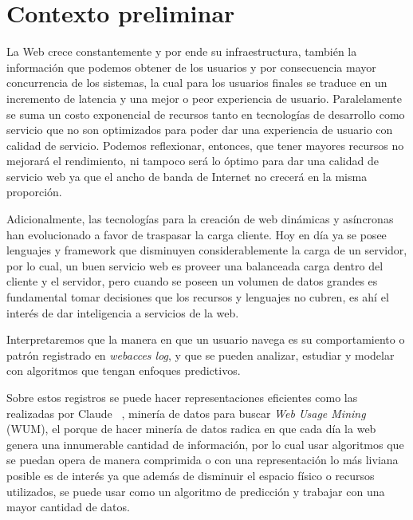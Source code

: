 \section{Contexto preliminar} 
\label{sec:preliminar}


  La Web crece constantemente y por ende su infraestructura, también la información que podemos obtener de los  usuarios y  por consecuencia mayor concurrencia de los sistemas, la cual para los usuarios finales se traduce en un incremento de latencia y una mejor o peor experiencia de usuario. Paralelamente se suma un costo exponencial de recursos tanto en tecnologías de desarrollo como servicio que no son optimizados para poder dar una experiencia de usuario con calidad de servicio. Podemos reflexionar, entonces, que tener mayores recursos no mejorará el rendimiento, ni tampoco será lo óptimo para dar una calidad de servicio web ya que el ancho de banda de Internet no crecerá en la misma proporción.
   
  Adicionalmente, las tecnologías para la creación de web dinámicas y asíncronas han evolucionado a favor de traspasar la carga cliente.
  Hoy en día ya se posee lenguajes y {framework} que disminuyen considerablemente la carga de un servidor, por lo cual, un buen servicio web es proveer una balanceada carga dentro del cliente y el servidor, pero cuando se poseen un volumen de datos grandes es fundamental tomar decisiones que los recursos y lenguajes no cubren, es ahí el interés de dar inteligencia a servicios de la web.

   Interpretaremos que la manera en que un usuario navega es su comportamiento o patrón registrado en \emph{webacces log}, y que se pueden analizar, estudiar y modelar con algoritmos que tengan enfoques predictivos. 

  Sobre estos registros se puede hacer representaciones eficientes como las realizadas por Claude \etal~\cite{Claude2014},  minería de datos para buscar \emph{Web Usage Mining} (WUM), el porque de hacer minería de datos radica en que cada día la web genera una innumerable cantidad de información, por lo cual usar algoritmos que se puedan opera de manera comprimida o con una representación lo más liviana posible es de interés ya que además de disminuir el espacio físico o recursos utilizados, se puede usar como un algoritmo de predicción y trabajar con una mayor cantidad de datos.
  
